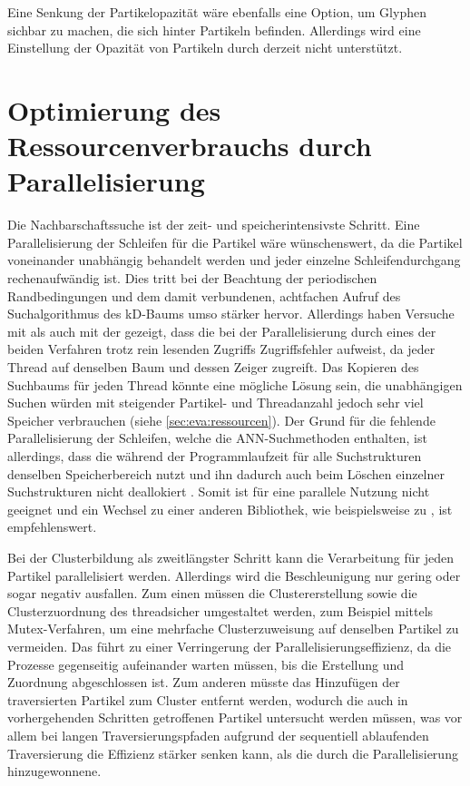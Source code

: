 Eine Senkung der Partikelopazität wäre ebenfalls eine Option, um Glyphen sichbar zu machen, die sich hinter Partikeln befinden. Allerdings wird eine Einstellung der Opazität von Partikeln durch  derzeit nicht unterstützt.

\section{Optimierung des Ressourcenverbrauchs durch Parallelisierung}\label{sec:disc:optimierung-para}
Die Nachbarschaftssuche ist der zeit- und speicherintensivste Schritt. Eine Parallelisierung der Schleifen für die Partikel wäre wünschenswert, da die Partikel voneinander unabhängig behandelt werden und jeder einzelne Schleifendurchgang rechenaufwändig ist. Dies tritt bei der Beachtung der periodischen Randbedingungen und dem damit verbundenen, achtfachen Aufruf des Suchalgorithmus des kD-Baums umso stärker hervor. Allerdings haben Versuche mit  als auch mit der \PPL gezeigt, dass die \ANN bei der Parallelisierung durch eines der beiden Verfahren trotz rein lesenden Zugriffs Zugriffsfehler aufweist, da jeder Thread auf denselben Baum und dessen Zeiger zugreift. Das Kopieren des Suchbaums für jeden Thread könnte eine mögliche Lösung sein, die unabhängigen Suchen würden mit steigender Partikel- und Threadanzahl jedoch sehr viel Speicher verbrauchen (siehe \autoref{sec:eva:ressourcen}).
Der Grund für die fehlende Parallelisierung der Schleifen, welche die \gls{ANN}-Suchmethoden enthalten, ist allerdings, dass die \ANN während der Programmlaufzeit für alle Suchstrukturen denselben Speicherbereich nutzt und ihn dadurch auch beim Löschen einzelner Suchstrukturen nicht deallokiert \cite[S.~8]{mount2010ann}. Somit ist \ANN für eine parallele Nutzung nicht geeignet und ein Wechsel zu einer anderen Bibliothek, wie beispielsweise zu \FLANN \cite{ohara2013annAlgo} \cite{wijewardena2014annPerformance}, ist empfehlenswert.

Bei der Clusterbildung als zweitlängster Schritt kann die Verarbeitung für jeden Partikel parallelisiert werden. Allerdings wird die Beschleunigung nur gering oder sogar negativ ausfallen. Zum einen müssen die Clustererstellung sowie die Clusterzuordnung des  threadsicher umgestaltet werden, zum Beispiel mittels Mutex-Verfahren, um eine mehrfache Clusterzuweisung auf denselben Partikel zu vermeiden. Das führt zu einer Verringerung der Parallelisierungseffizienz, da die Prozesse gegenseitig aufeinander warten müssen, bis die Erstellung und Zuordnung abgeschlossen ist. Zum anderen müsste das Hinzufügen der traversierten Partikel zum Cluster entfernt werden, wodurch die auch in vorhergehenden Schritten getroffenen Partikel untersucht werden müssen, was vor allem bei langen Traversierungspfaden aufgrund der sequentiell ablaufenden Traversierung die Effizienz stärker senken kann, als die durch die Parallelisierung hinzugewonnene.

